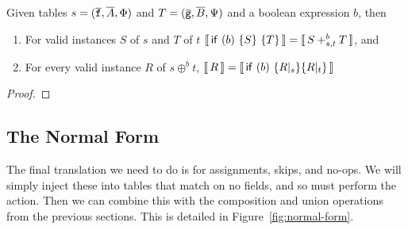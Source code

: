 \begin{theorem}
  Given tables $s = (\overline{\texttt{f}}, \overline{A}, \Phi)$ and
  $T = (\overline{\texttt{g}}, \overline{B}, \Psi)$ and a boolean expression $b$,
  then
  \begin{enumerate}
  \item For valid instances $S$ of $s$ and $T$ of $t$
    $\llbracket\,\mathsf{if}~(b)~\{S\}~\{T\}\,\rrbracket = \llbracket\,S +_{s,t}^b T\,\rrbracket$, and
  \item For every valid instance $R$ of $s \oplus^b t$,
    $\llbracket\,R\,\rrbracket = \llbracket\,\mathsf{if}~(b)~\{R|_s\} \{R|_t\}\,\rrbracket$
  \end{enumerate}
\end{theorem}
\begin{proof}
\end{proof}


\subsection{The Normal Form}

The final translation we need to do is for assignments, skips, and
no-ops. We will simply inject these into tables that match on no
fields, and so must perform the action. Then we can combine this with
the composition and union operations from the previous sections. This
is detailed in Figure~\ref{fig:normal-form}.

